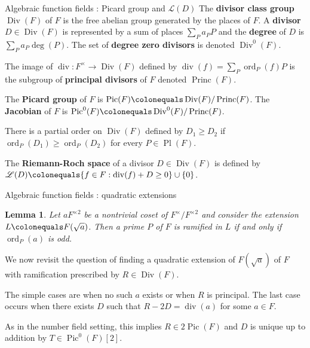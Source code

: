\documentclass[xcolor=dvipsnames]{beamer}
\theoremstyle{plain}
\newtheorem*{lem}{Lemma}
\DeclareMathOperator{\Div}{Div}
\DeclareMathOperator{\Princ}{Princ}
\DeclareMathOperator{\Pic}{Pic}
\DeclareMathOperator{\ddiv}{div}
\DeclareMathOperator{\ord}{ord}
\DeclareMathOperator{\Pl}{Pl}
\begin{document}
  \begin{frame}{Algebraic function fields : Picard group and $\mathscr{L}(D)$}
    The \textbf{divisor class group}
    $\Div(F)$ of $F$ is the free abelian group
    generated by the places of $F$.
    A \textbf{divisor} $D\in\Div(F)$ is represented by
    a sum of places $\sum_{P}a_PP$
    and the \textbf{degree}
    of $D$ is $\sum_{P}a_P\deg(P)$.
    \newline
    The set of \textbf{degree zero divisors} is denoted
    $\Div^0(F)$.
    \par
    The image of $\ddiv\colon F^\times\to\Div(F)$ defined by
    $
      \ddiv(f) = \sum_{P}\ord_P(f)P
    $
    is the subgroup of
    \textbf{principal divisors} of $F$
    denoted $\Princ(F)$.
    \par
    The \textbf{Picard group} of $F$ is
    $\Pic(F)\colonequals\Div(F)/\Princ(F)$.
    \newline
    The \textbf{Jacobian} of $F$ is
    $\Pic^0(F)\colonequals\Div^0(F)/\Princ(F)$.
    \par
    There is a partial order on $\Div(F)$
    defined by $D_1\geq D_2$ if
    $\ord_P(D_1)\geq\ord_P(D_2)$ for
    every $P\in\Pl(F)$.
    \par
    The \textbf{Riemann-Roch space} of a divisor
    $D\in\Div(F)$ is defined by
    $\mathscr{L}(D)\colonequals\{f\in F : \ddiv(f)+D\geq 0\}\cup\{0\}$.
  \end{frame}
  \begin{frame}{Algebraic function fields : quadratic extensions}
    \begin{lem}
      \vspace{1pt}
      Let $aF^{\times 2}$ be a nontrivial coset of
      $F^\times/F^{\times 2}$ and consider the
      extension $L\colonequals F(\sqrt{a})$.
      Then a prime $P$ of $F$ is
      ramified in $L$
      if and only if
      $\ord_P(a)$ is odd.
    \end{lem}
    We now revisit the question of finding a quadratic extension
    of $F(\sqrt{a})$ of $F$ with ramification prescribed
    by $R\in\Div(F)$.
    \par
    The simple cases are when no such $a$ exists
    or when $R$ is principal.
    The last case occurs when there exists
    $D$ such that $R-2D=\ddiv(a)$ for some $a\in F$.
    \par
    As in the number field setting, this implies
    $R\in 2\Pic(F)$ and $D$ is unique up to
    addition by $T\in\Pic^0(F)[2]$.
  \end{frame}
\end{document}
